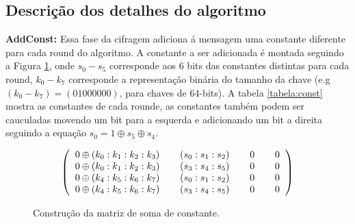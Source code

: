 \documentclass[runningheads,a4paper,11pt]{llncs}
\begin{document}
\subsection{Descri\c{c}\~ao dos detalhes do algoritmo}
\textbf{AddConst:} Essa fase da cifragem adiciona \'a mensagem uma constante diferente para cada round do algoritmo. A constante a ser adicionada \'e montada seguindo a Figura \ref{figura:add_const}, onde $s_0 - s_5$ corresponde aos 6 bits das constantes distintas para cada round, $k_0 - k_7$ corresponde a representa\c{c}\~ao bin\'aria do tamanho da chave (e.g $(k_0-k_7)=(01000000)$, para chaves de 64-bits).
A tabela \ref{tabela:const} mostra as constantes de cada rounde, as constantes tamb\'em podem ser cauculadas movendo um bit para a esquerda e adicionando um bit a direita seguindo a equa\c{c}\~ao $s_0 = 1 \oplus s_5 \oplus s_4$.

\begin{figure}
	\caption{Constru\c{c}\~ao da matriz de soma de constante.\label{figura:add_const}}
	\[
	\begin{pmatrix}
	\hspace{2mm} 0 \oplus (k_0:k_1:k_2:k_3) \hspace{2mm} & \hspace{2mm} (s_0:s_1:s_2) \hspace{2mm} & \hspace{2mm} 0 \hspace{2mm} & \hspace{2mm} 0 \hspace{2mm} \\
	0 \oplus (k_0:k_1:k_2:k_3) & (s_3:s_4:s_5) & 0 & 0 \\
	0 \oplus (k_4:k_5:k_6:k_7) & (s_0:s_1:s_2) & 0 & 0 \\
	0 \oplus (k_4:k_5:k_6:k_7) & (s_3:s_4:s_5) & 0 & 0 \\
	
	\end{pmatrix}
	\]
\end{figure}
\end{document}
